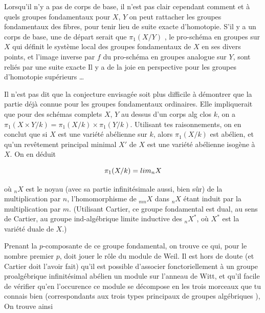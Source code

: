 \documentclass[11pt,a4paper]{article}
\begin{document}

Lorsqu'il n'y a pas de corps de base, il n'est pas clair cependant comment et à
quels groupes fondamentaux \struck{\ill{}} pour $X$, $Y$ on peut rattacher
\struck{\ill{}} les groupes fondamentaux des fibres, pour tenir lieu de suite
exacte d'homotopie. S'il y a un corps de base, une 
\struck{\ill{}} de départ serait que 
$\pi_{1}(X/Y)$ , le pro-schéma en groupes sur $X$ qui
définit le système local des groupes fondamentaux \struck{\ill{}} de $X$ en ses
divers points, et  l'image inverse par $f$ du pro-schéma en
groupes analogue  sur $Y$, sont reliés par une suite exacte
 Il y a de la joie en perspective pour les groupes
d'homotopie supérieurs \ldots

Il n'est pas dit que la conjecture envisagée soit plus difficile à démontrer
que la partie déjà connue pour les groupes fondamentaux ordinaires. Elle
impliquerait que pour des schémas complets $X$, $Y$ au dessus d'un corps alg
clos $k$, on a $\pi_{1}(X \times Y/k) = \pi_{1}(X/k) \times \pi_{1}(Y/k)$.
Utilisant tes raisonnements, on en conclut que si $X$ est une variété abélienne
sur $k$, alors $\pi_{1}(X/k)$ est abélien, et qu'un revêtement principal
minimal $X'$ de $X$ est une variété abélienne isogène à $X$. On en déduit

\[ \pi_{1}(X/k) = \varprojlim {}_{n}X \]

où ${}_{n}X$ est le noyau (avec sa partie infinitésimale aussi, bien sûr) de la
multiplication par $n$, l'homomorphisme de ${}_{mn}X$ dans ${}_{n}X$ étant
induit par la multiplication par $m$. (Utilisant Cartier, ce groupe fondamental
est dual, au sens de Cartier, au groupe ind-algébrique limite inductive des
${}_{n}X^{*}$, où $X^{*}$ est la variété duale de $X$.)

Prenant la $p$-composante de ce groupe fondamental, on trouve ce qui, pour le
nombre premier $p$, doit jouer le rôle du module de Weil. Il est hors de doute
(et Cartier doit l'avoir fait) qu'il est possible d'associer \struck{\ill{}}
fonctoriellement à un groupe proalgébrique infinitésimal abélien un module sur
l'anneau de Witt, et \struck{\ill{}} qu'il  facile de vérifier qu'en
l'occurence ce module se décompose en les trois morceaux que tu connais bien
(correspondants aux trois types principaux de groupes algébriques
), \struck{\ill{}} On trouve ainsi
\end{document}
